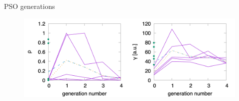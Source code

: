 \documentclass[hyperref={pdfpagelabels=false}, aspectratio=43, t]{beamer}  %
\begin{document}
\begin{frame}{PSO generations}\begin{figure}\includegraphics[width=.96\textwidth]{figures/emma-gen.png}\end{figure}\end{frame}
\end{document}
